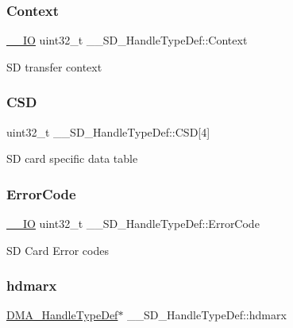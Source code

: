 \subsubsection{\texorpdfstring{Context}{Context}}
{\footnotesize\ttfamily \mbox{\hyperlink{core__sc300_8h_aec43007d9998a0a0e01faede4133d6be}{\+\_\+\+\_\+\+IO}} uint32\+\_\+t \+\_\+\+\_\+\+S\+D\+\_\+\+Handle\+Type\+Def\+::\+Context}

SD transfer context \mbox{\label{struct_____s_d___handle_type_def_a8179bd0b4432d5ebd135dcbbfecfab7a}} 
\subsubsection{\texorpdfstring{CSD}{CSD}}
{\footnotesize\ttfamily uint32\+\_\+t \+\_\+\+\_\+\+S\+D\+\_\+\+Handle\+Type\+Def\+::\+C\+SD\mbox{[}4\mbox{]}}

SD card specific data table \mbox{\label{struct_____s_d___handle_type_def_a21c46b0a3536288c77afb861424703a5}} 
\subsubsection{\texorpdfstring{ErrorCode}{ErrorCode}}
{\footnotesize\ttfamily \mbox{\hyperlink{core__sc300_8h_aec43007d9998a0a0e01faede4133d6be}{\+\_\+\+\_\+\+IO}} uint32\+\_\+t \+\_\+\+\_\+\+S\+D\+\_\+\+Handle\+Type\+Def\+::\+Error\+Code}

SD Card Error codes \mbox{\label{struct_____s_d___handle_type_def_a7f4585e7d490fe8eeba54208c4a85d0e}} 
\subsubsection{\texorpdfstring{hdmarx}{hdmarx}}
{\footnotesize\ttfamily \mbox{\hyperlink{group___d_m_a___exported___types_ga41b754a906b86bce54dc79938970138b}{D\+M\+A\+\_\+\+Handle\+Type\+Def}}$\ast$ \+\_\+\+\_\+\+S\+D\+\_\+\+Handle\+Type\+Def\+::hdmarx}

